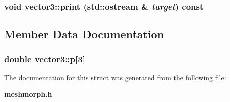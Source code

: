 \subsubsection{\setlength{\rightskip}{0pt plus 5cm}void vector3::print (std::ostream \& {\em target}) const\hspace{0.3cm}{\tt  [inline]}}\label{structvector3_dc15d3f833f7a62149fd0a888b9fa5c1}




\subsection{Member Data Documentation}
\subsubsection{\setlength{\rightskip}{0pt plus 5cm}double {\bf vector3::p}[3]}\label{structvector3_89904ef9d7c3ce1b8261834001f3133e}




The documentation for this struct was generated from the following file:\begin{CompactItemize}
\item 
{\bf meshmorph.h}\end{CompactItemize}
